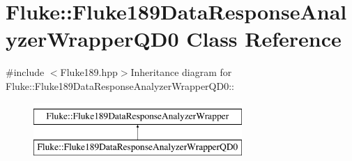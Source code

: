 \hypertarget{classFluke_1_1Fluke189DataResponseAnalyzerWrapperQD0}{
\section{Fluke::Fluke189DataResponseAnalyzerWrapperQD0 Class Reference}
\label{classFluke_1_1Fluke189DataResponseAnalyzerWrapperQD0}
}


{\ttfamily \#include $<$Fluke189.hpp$>$}Inheritance diagram for Fluke::Fluke189DataResponseAnalyzerWrapperQD0::\begin{figure}[H]
\begin{center}
\leavevmode
\includegraphics[height=2cm]{classFluke_1_1Fluke189DataResponseAnalyzerWrapperQD0}
\end{center}
\end{figure}
